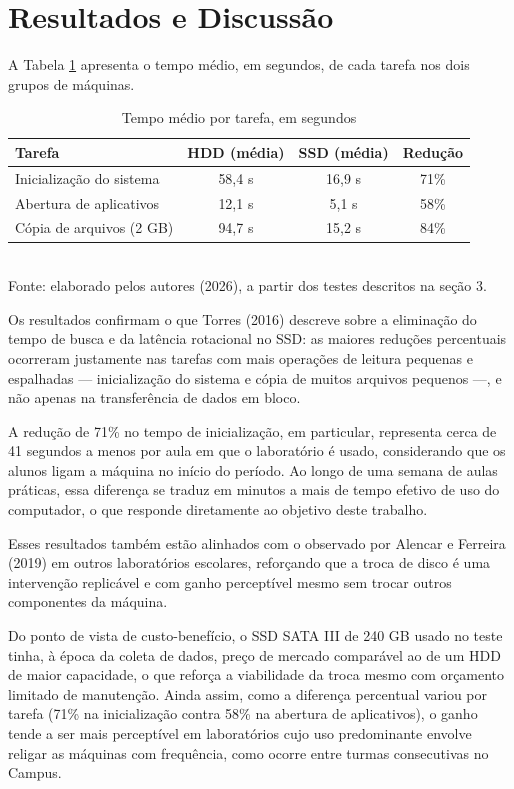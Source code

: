 \documentclass[article,12pt,a4paper,oneside]{abntex2}
\begin{document}
\section{Resultados e Discussão}

A Tabela \ref{tab:resultados} apresenta o tempo médio, em segundos, de cada
tarefa nos dois grupos de máquinas.

\begin{table}[!ht]
  \centering
  \caption{Tempo médio por tarefa, em segundos}
  \label{tab:resultados}
  \begin{tabular}{lccc}
    \hline
    Tarefa & HDD (média) & SSD (média) & Redução \\
    \hline
    Inicialização do sistema & 58,4 s & 16,9 s & 71\% \\
    Abertura de aplicativos  & 12,1 s & 5,1 s  & 58\% \\
    Cópia de arquivos (2 GB) & 94,7 s & 15,2 s & 84\% \\
    \hline
  \end{tabular}
  \\[0.3em]
  {\footnotesize Fonte: elaborado pelos autores (2026), a partir dos testes descritos na seção 3.}
\end{table}

Os resultados confirmam o que Torres (2016) descreve sobre a eliminação do
tempo de busca e da latência rotacional no SSD: as maiores reduções
percentuais ocorreram justamente nas tarefas com mais operações de leitura
pequenas e espalhadas — inicialização do sistema e cópia de muitos arquivos
pequenos —, e não apenas na transferência de dados em bloco.

A redução de 71\% no tempo de inicialização, em particular, representa cerca
de 41 segundos a menos por aula em que o laboratório é usado, considerando
que os alunos ligam a máquina no início do período. Ao longo de uma semana
de aulas práticas, essa diferença se traduz em minutos a mais de tempo
efetivo de uso do computador, o que responde diretamente ao objetivo deste
trabalho.

Esses resultados também estão alinhados com o observado por Alencar e
Ferreira (2019) em outros laboratórios escolares, reforçando que a troca de
disco é uma intervenção replicável e com ganho perceptível mesmo sem trocar
outros componentes da máquina.

Do ponto de vista de custo-benefício, o SSD SATA III de 240 GB usado no
teste tinha, à época da coleta de dados, preço de mercado comparável ao de
um HDD de maior capacidade, o que reforça a viabilidade da troca mesmo com
orçamento limitado de manutenção. Ainda assim, como a diferença percentual
variou por tarefa (71\% na inicialização contra 58\% na abertura de
aplicativos), o ganho tende a ser mais perceptível em laboratórios cujo uso
predominante envolve religar as máquinas com frequência, como ocorre entre
turmas consecutivas no Campus.
\end{document}
